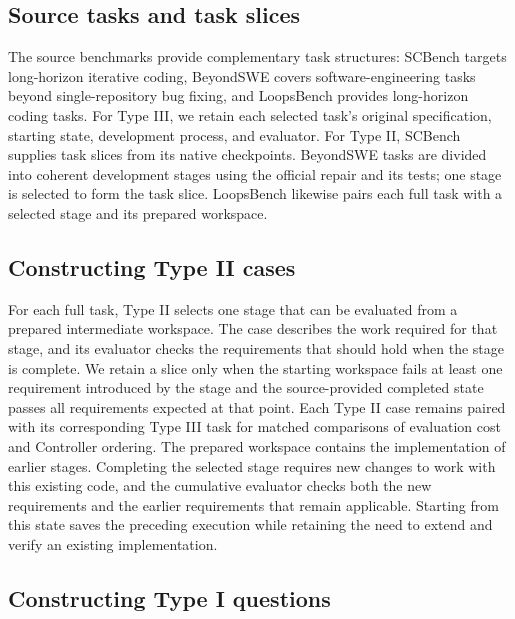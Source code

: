 \subsection{Source tasks and task slices}

The source benchmarks provide complementary task structures: SCBench targets long-horizon iterative coding, BeyondSWE covers software-engineering tasks beyond single-repository bug fixing, and LoopsBench provides long-horizon coding tasks. For Type III, we retain each selected task's original specification, starting state, development process, and evaluator. For Type II, SCBench supplies task slices from its native checkpoints. BeyondSWE tasks are divided into coherent development stages using the official repair and its tests; one stage is selected to form the task slice. LoopsBench likewise pairs each full task with a selected stage and its prepared workspace.

\subsection{Constructing Type II cases}

For each full task, Type II selects one stage that can be evaluated from a prepared intermediate workspace. The case describes the work required for that stage, and its evaluator checks the requirements that should hold when the stage is complete. We retain a slice only when the starting workspace fails at least one requirement introduced by the stage and the source-provided completed state passes all requirements expected at that point. Each Type II case remains paired with its corresponding Type III task for matched comparisons of evaluation cost and Controller ordering. The prepared workspace contains the implementation of earlier stages. Completing the selected stage requires new changes to work with this existing code, and the cumulative evaluator checks both the new requirements and the earlier requirements that remain applicable. Starting from this state saves the preceding execution while retaining the need to extend and verify an existing implementation.

\subsection{Constructing Type I questions}


